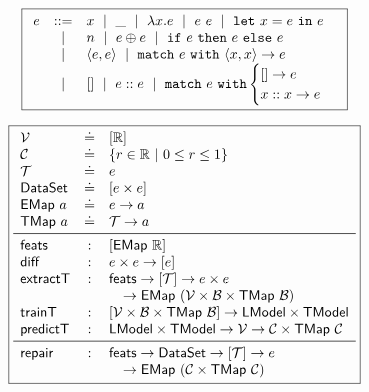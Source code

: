 \begin{figure}
\small
\centering
\begin{minipage}[c]{\linewidth}
  \[
  \boxed{
  \begin{array}{rcl}
  e & ::=    & x \ \mid\  \_  \ \mid\  \lambda x. e \ \mid\  e\ e \ \mid\  \mathtt{let}\ x = e\ \mathtt{in}\ e \\
    & \ \mid\  & n \ \mid\  e \oplus e \ \mid\  \mathtt{if}\ e\ \mathtt{then}\ e\ \mathtt{else}\ e \\
    & \ \mid\  & \langle e, e \rangle \ \mid\  \mathtt{match}\ e\ \mathtt{with}\ \langle x, x \rangle \to e \\
    & \ \mid\  & \mathtt{[]} \ \mid\  e :: e \ \mid\  \mathtt{match}\ e\ \mathtt{with} \begin{cases} \mathtt{[]} \to e\\ x :: x \to e \end{cases} \\[0.05in]
  \end{array}
  }
  \]
  \label{fig:syntax}
\end{minipage}
\begin{minipage}[c]{\linewidth}
  \lstDeleteShortInline{|} %
  \[
  \boxed{
  \begin{array}{lcl}
    \V           & \defeq & \List{\R}\\
    \Runit       & \defeq & \{r \in \R\ |\ 0 \le r \le 1\} \\
    \T           & \defeq & e \\
    \Dataset     & \defeq & \List{e \times e} \\
    \Emap{a}     & \defeq & e \to a \\
    \Tmap{a}     & \defeq & \T \to a \\
    \midrule
    \featuresym  & : & \List{\Emap{\R}} \\
    \diffsym     & : & e \times e \to \List{e} \\
    \extractTsym & : & \featuresym \to \List{\T} \to e \times e \\
                 &   & \quad \to \Emap{(\V \times \B \times \Tmap{\B})} \\
    \trainTsym   & : & \List{\V \times \B \times \Tmap{\B}} \to \Model \times \ModelT \\
    \predictTsym & : & \Model \times \ModelT \to \V \to \Runit \times \Tmap{\Runit} \\
    \midrule
    \repairsym   & : & \featuresym \to \Dataset \to \List{\T} \to e \\
                 &   & \quad \to \Emap{(\Runit \times \Tmap{\Runit})}
  \end{array}
  }
  \]
  \lstMakeShortInline{|}
  \label{fig:api}
\end{minipage}
\end{figure}
